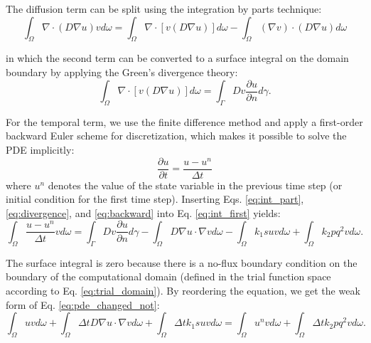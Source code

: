 \noindent The diffusion term can be split using the integration by parts technique:
\begin{equation} \label{eq:int_part}
\int_{\Omega} \nabla \cdot (D  \nabla u) v d \omega = \int_{\Omega} \nabla \cdot[v(D  \nabla u)] d \omega-\int_{\Omega} (\nabla v) \cdot(D  \nabla u) d \omega
\end{equation}

\noindent in which the second term can be converted to a surface integral on the domain boundary by applying the Green's divergence theory:
\begin{equation} \label{eq:divergence}
\int_{\Omega} \nabla \cdot[v(D  \nabla u)] d \omega = \int_{\Gamma} D v \frac{\partial u}{\partial n} d \gamma.
\end{equation}

\noindent For the temporal term, we use the finite difference method and apply a first-order backward Euler scheme for discretization, which makes it possible to solve the {PDE} implicitly:
\begin{equation} \label{eq:backward}
\frac{\partial u}{\partial t} = \frac{u-u^{n}}{\Delta t}
\end{equation}
\noindent where $u^n$ denotes the value of the state variable in the previous time step (or initial condition for the first time step). Inserting Eqs. \ref{eq:int_part}, \ref{eq:divergence}, and \ref{eq:backward} into Eq. \ref{eq:int_first} yields:
\begin{equation}
\int_{\Omega} \frac{u-u^{n}}{\Delta t} v d \omega=\int_{\Gamma} D v  \frac{\partial u}{\partial n} d \gamma-\int_{\Omega} D  \nabla u \cdot \nabla v d \omega-\int_{\Omega} k_{1} s u v d \omega+\int_{\Omega} k_{2} p q^{2} v d \omega.
\end{equation}

\noindent The surface integral is zero because there is a no-flux boundary condition on the boundary of the computational domain (defined in the trial function space according to Eq. \ref{eq:trial_domain}). By reordering the equation, we get the weak form of Eq. \ref{eq:pde_changed_not}:
\begin{equation}  \label{eq:weak_general}
\int_{\Omega} {u} v d \omega+\int_{\Omega} \Delta t D  \nabla u \cdot  \nabla v d \omega+\int_{\Omega} \Delta tk_{1} s u v d \omega=\int_{\Omega} {u^{n}} v d \omega+\int_{\Omega} \Delta t k_{2} p q^{2} v d \omega.
\end{equation}


